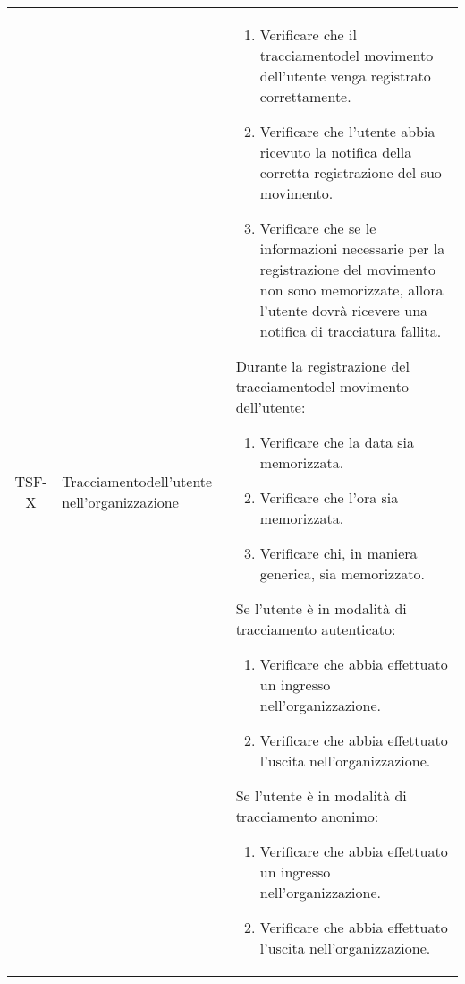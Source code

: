 {\begin{longtable}{ c | C{3cm} | C{11cm} }
TSF-X & Tracciamentodell'utente nell'organizzazione & \begin{enumerate}
    \item Verificare che il tracciamentodel movimento dell'utente venga registrato correttamente.
    \item Verificare che l'utente abbia ricevuto la notifica della corretta registrazione del suo movimento.
    \item Verificare che se le informazioni necessarie per la registrazione del movimento non sono memorizzate, allora l'utente dovrà ricevere una notifica di tracciatura fallita.
\end{enumerate}
Durante la registrazione del tracciamentodel movimento dell'utente:
\begin{enumerate}
    \item Verificare che la data sia memorizzata.
    \item Verificare che l'ora sia memorizzata.
    \item Verificare chi, in maniera generica, sia memorizzato.
\end{enumerate}
Se l'utente è in modalità di tracciamento autenticato:
\begin{enumerate}
    \item Verificare che abbia effettuato un ingresso nell'organizzazione.
    \item Verificare che abbia effettuato l'uscita nell'organizzazione.
\end{enumerate}
Se l'utente è in modalità di tracciamento anonimo:
\begin{enumerate}
    \item Verificare che abbia effettuato un ingresso nell'organizzazione.
    \item Verificare che abbia effettuato l'uscita nell'organizzazione.
\end{enumerate} \\


\end{longtable}}
